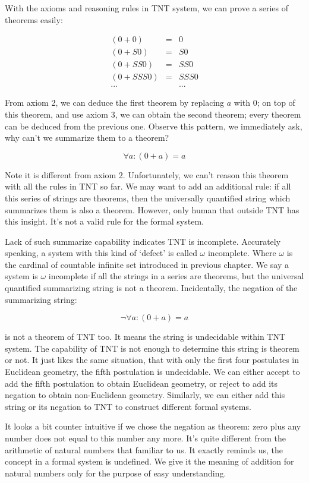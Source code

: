 \documentclass[b5paper]{article}
\begin{document}
With the axioms and reasoning rules in TNT system, we can prove a series of theorems easily:

\[
\begin{array}{rcl}
(0 + 0) & = & 0 \\
(0 + S0) & = & S0 \\
(0 + SS0) & = & SS0 \\
(0 + SSS0) & = & SSS0 \\
... & & ...
\end{array}
\]

From axiom 2, we can deduce the first theorem by replacing $a$ with 0; on top of this theorem, and use axiom 3, we can obtain the second theorem; every theorem can be deduced from the previous one. Observe this pattern, we immediately ask, why can't we summarize them to a theorem?

\[
\forall a: (0 + a) = a
\]

Note it is different from axiom 2. Unfortunately, we can't reason this theorem with all the rules in TNT so far. We may want to add an additional rule: if all this series of strings are theorems, then the universally quantified string which summarizes them is also a theorem. However, only human that outside TNT has this insight. It's not a valid rule for the formal system.

Lack of such summarize capability indicates TNT is incomplete. Accurately speaking, a system with this kind of `defect' is called $\omega$ incomplete. Where $\omega$ is the cardinal of countable infinite set introduced in previous chapter. We say a system is $\omega$ incomplete if all the strings in a series are theorems, but the universal quantified summarizing string is not a theorem. Incidentally, the negation of the summarizing string:

\[
\lnot \forall a: (0 + a) = a
\]

is not a theorem of TNT too. It means the string is undecidable within TNT system. The capability of TNT is not enough to determine this string is theorem or not. It just likes the same situation, that with only the first four postulates in Euclidean geometry, the fifth postulation is undecidable. We can either accept to add the fifth postulation to obtain Euclidean geometry, or reject to add its negation to obtain non-Euclidean geometry. Similarly, we can either add this string or its negation to TNT to construct different formal systems.

It looks a bit counter intuitive if we chose the negation as theorem: zero plus any number does not equal to this number any more. It's quite different from the arithmetic of natural numbers that familiar to us. It exactly reminds us, the concept in a formal system is undefined. We give it the meaning of addition for natural numbers only for the purpose of easy understanding.
\end{document}
